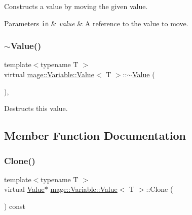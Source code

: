 Constructs a value by moving the given value.


\begin{DoxyParams}[1]{Parameters}
\mbox{\tt in}  & {\em value} & A reference to the value to move. \\
\hline
\end{DoxyParams}
\hypertarget{structmage_1_1_variable_1_1_value_ab77eb80d4786a060778dc41ee73c1371}{}\label{structmage_1_1_variable_1_1_value_ab77eb80d4786a060778dc41ee73c1371} 
\subsubsection{\texorpdfstring{$\sim$\+Value()}{~Value()}}
{\footnotesize\ttfamily template$<$typename T $>$ \\
virtual \hyperlink{structmage_1_1_variable_1_1_value}{mage\+::\+Variable\+::\+Value}$<$ T $>$\+::$\sim$\hyperlink{structmage_1_1_variable_1_1_value}{Value} (\begin{DoxyParamCaption}{ }\end{DoxyParamCaption})\hspace{0.3cm}{\ttfamily [virtual]}, {\ttfamily [default]}}

Destructs this value. 

\subsection{Member Function Documentation}
\hypertarget{structmage_1_1_variable_1_1_value_a4d59fec74fc5d25ecca86054ecc8d15d}{}\label{structmage_1_1_variable_1_1_value_a4d59fec74fc5d25ecca86054ecc8d15d} 
\subsubsection{\texorpdfstring{Clone()}{Clone()}}
{\footnotesize\ttfamily template$<$typename T $>$ \\
virtual \hyperlink{structmage_1_1_variable_1_1_value}{Value}$\ast$ \hyperlink{structmage_1_1_variable_1_1_value}{mage\+::\+Variable\+::\+Value}$<$ T $>$\+::Clone (\begin{DoxyParamCaption}{ }\end{DoxyParamCaption}) const\hspace{0.3cm}{\ttfamily [virtual]}}

